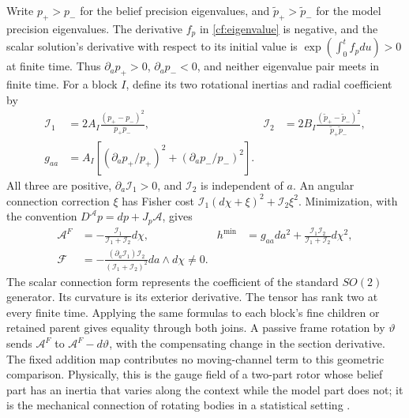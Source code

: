 Write $p_+>p_-$ for the belief precision eigenvalues, and $\tilde p_+>\tilde p_-$ for the model precision eigenvalues. The derivative $f_p$ in \cref{cf:eigenvalue} is negative, and the scalar solution's derivative with respect to its initial value is $\exp(\int_0^t f_pdu)>0$ at finite time. Thus $\partial_ap_+>0$, $\partial_ap_-<0$, and neither eigenvalue pair meets in finite time. For a block $I$, define its two rotational inertias and radial coefficient by
\begin{equation}
 \begin{aligned}
 \mathcal I_1&=2A_I\frac{(p_+-p_-)^2}{p_+p_-},
 &\mathcal I_2&=2B_I\frac{(\tilde p_+-\tilde p_-)^2}{\tilde p_+\tilde p_-},\\
 g_{aa}&=A_I\left[
 (\partial_ap_+/p_+)^2+(\partial_ap_-/p_-)^2\right].
 \end{aligned}
\end{equation}
All three are positive, $\partial_a\mathcal I_1>0$, and $\mathcal I_2$ is independent of $a$. An angular connection correction $\xi$ has Fisher cost $\mathcal I_1(d\chi+\xi)^2+\mathcal I_2\xi^2$. Minimization, with the convention $D^{\mathcal A}p=dp+J_p\mathcal A$, gives
\begin{equation}
 \begin{aligned}
 \mathcal A^F&=-\frac{\mathcal I_1}{\mathcal I_1+\mathcal I_2}d\chi,
 &h^{\min}&=g_{aa}da^2+\frac{\mathcal I_1\mathcal I_2}{\mathcal I_1+\mathcal I_2}d\chi^2,\\
 \mathcal F&=-\frac{(\partial_a\mathcal I_1)\mathcal I_2}{(\mathcal I_1+\mathcal I_2)^2}da\wedge d\chi
 \ne0.
 \end{aligned}
 \label{cf:curvature}
\end{equation}
The scalar connection form represents the coefficient of the standard $SO(2)$ generator. Its curvature is its exterior derivative. The tensor has rank two at every finite time. Applying the same formulas to each block's fine children or retained parent gives equality through both joins. A passive frame rotation by $\vartheta$ sends $\mathcal A^F$ to $\mathcal A^F-d\vartheta$, with the compensating change in the section derivative. The fixed addition map contributes no moving-channel term to this geometric comparison. Physically, this is the gauge field of a two-part rotor whose belief part has an inertia that varies along the context while the model part does not; it is the mechanical connection of rotating bodies in a statistical setting \citep{Smale1970}.

